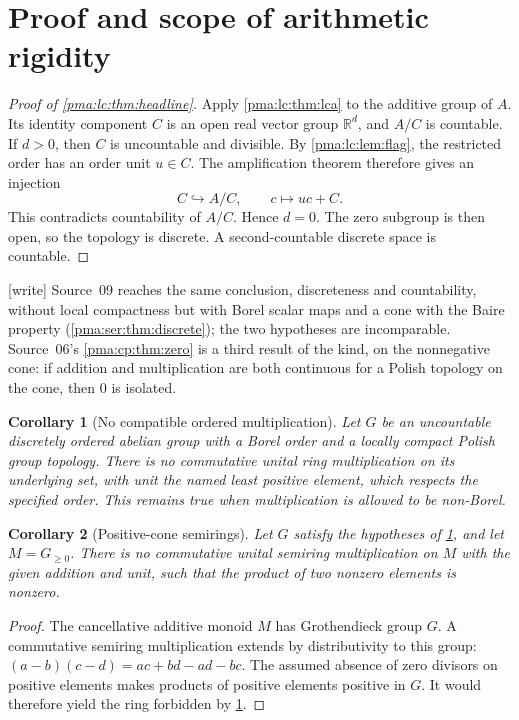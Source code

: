 \documentclass[11pt]{article}
\numberwithin{equation}{section}
\newtheorem{corollary}[corollary]{Corollary}
\theoremstyle{definition}
\theoremstyle{remark}
\newcommand{\R}{\mathbb R}
\newcommand{\writetag}{\textup{\textsf{\small[write]}}}
\begin{document}
\section{Proof and scope of arithmetic rigidity}
\label{pma:lc:sec:rigidity}

\begin{proof}[Proof of \cref{pma:lc:thm:headline}]
Apply \cref{pma:lc:thm:lca} to the additive group of $A$. Its identity component
$C$ is an open real vector group $\R^d$, and $A/C$ is countable.
If $d>0$, then $C$ is uncountable and divisible. By \cref{pma:lc:lem:flag}, the
restricted order has an order unit $u\in C$. The amplification theorem
therefore gives an injection
\[
 C\hookrightarrow A/C,\qquad c\longmapsto uc+C.
\]
This contradicts countability of $A/C$. Hence $d=0$. The zero subgroup is
then open, so the topology is discrete. A second-countable discrete space
is countable.
\end{proof}

\noindent\writetag{} Source~09 reaches the same conclusion, discreteness and
countability, without local compactness but with Borel scalar maps and a cone
with the Baire property (\cref{pma:ser:thm:discrete}); the two hypotheses
are incomparable. Source~06's \cref{pma:cp:thm:zero} is a third result of
the kind, on the nonnegative cone: if addition and multiplication are both
continuous for a Polish topology on the cone, then $0$ is isolated.

\begin{corollary}[No compatible ordered multiplication]\label{pma:lc:cor:noexpansion}
Let $G$ be an uncountable discretely ordered abelian group with a Borel
order and a locally compact Polish group topology. There is no
commutative unital ring multiplication on its underlying set, with unit
the named least positive element, which respects the specified order.
This remains true when multiplication is allowed to be non-Borel.
\end{corollary}

\begin{corollary}[Positive-cone semirings]\label{pma:lc:cor:semiring}
Let $G$ satisfy the hypotheses of \cref{pma:lc:cor:noexpansion}, and let
$M=G_{\ge0}$. There is no commutative unital semiring multiplication on
$M$ with the given addition and unit, such that the product of two
nonzero elements is nonzero.
\end{corollary}
\begin{proof}
The cancellative additive monoid $M$ has Grothendieck group $G$.
A commutative semiring multiplication extends by distributivity to this
group: $(a-b)(c-d)=ac+bd-ad-bc$. The assumed absence of zero divisors
on positive elements makes products of positive elements positive in
$G$. It would therefore yield the ring forbidden by
\cref{pma:lc:cor:noexpansion}.
\end{proof}
\end{document}
